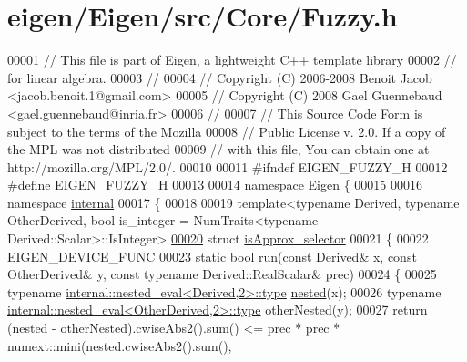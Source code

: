 \hypertarget{eigen_2_eigen_2src_2_core_2_fuzzy_8h_source}{}\section{eigen/\+Eigen/src/\+Core/\+Fuzzy.h}
\label{eigen_2_eigen_2src_2_core_2_fuzzy_8h_source}

\begin{DoxyCode}
00001 \textcolor{comment}{// This file is part of Eigen, a lightweight C++ template library}
00002 \textcolor{comment}{// for linear algebra.}
00003 \textcolor{comment}{//}
00004 \textcolor{comment}{// Copyright (C) 2006-2008 Benoit Jacob <jacob.benoit.1@gmail.com>}
00005 \textcolor{comment}{// Copyright (C) 2008 Gael Guennebaud <gael.guennebaud@inria.fr>}
00006 \textcolor{comment}{//}
00007 \textcolor{comment}{// This Source Code Form is subject to the terms of the Mozilla}
00008 \textcolor{comment}{// Public License v. 2.0. If a copy of the MPL was not distributed}
00009 \textcolor{comment}{// with this file, You can obtain one at http://mozilla.org/MPL/2.0/.}
00010 
00011 \textcolor{preprocessor}{#ifndef EIGEN\_FUZZY\_H}
00012 \textcolor{preprocessor}{#define EIGEN\_FUZZY\_H}
00013 
00014 \textcolor{keyword}{namespace }\hyperlink{namespace_eigen}{Eigen} \{ 
00015 
00016 \textcolor{keyword}{namespace }\hyperlink{namespaceinternal}{internal}
00017 \{
00018 
00019 template<typename Derived, typename OtherDerived, bool is\_integer = NumTraits<typename
       Derived::Scalar>::IsInteger>
\hyperlink{struct_eigen_1_1internal_1_1is_approx__selector}{00020} \textcolor{keyword}{struct }\hyperlink{struct_eigen_1_1internal_1_1is_approx__selector}{isApprox\_selector}
00021 \{
00022   EIGEN\_DEVICE\_FUNC
00023   \textcolor{keyword}{static} \textcolor{keywordtype}{bool} run(\textcolor{keyword}{const} Derived& x, \textcolor{keyword}{const} OtherDerived& y, \textcolor{keyword}{const} \textcolor{keyword}{typename} Derived::RealScalar& prec)
00024   \{
00025     \textcolor{keyword}{typename} \hyperlink{class_eigen_1_1internal_1_1_tensor_lazy_evaluator_writable}{internal::nested\_eval<Derived,2>::type} 
      \hyperlink{struct_eigen_1_1internal_1_1nested}{nested}(x);
00026     \textcolor{keyword}{typename} \hyperlink{class_eigen_1_1internal_1_1_tensor_lazy_evaluator_writable}{internal::nested\_eval<OtherDerived,2>::type} 
      otherNested(y);
00027     \textcolor{keywordflow}{return} (nested - otherNested).cwiseAbs2().sum() <= prec * prec * numext::mini(nested.cwiseAbs2().sum(),

\end{DoxyCode}
